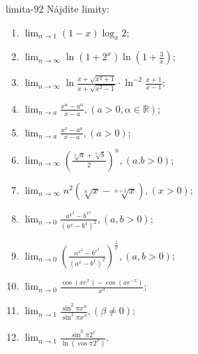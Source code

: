 \begin{defproblem}{limita-92}
Nájdite limity:
\begin{multicols}{2}
\begin{enumerate}
    \item $\lim_{n \rightarrow 1} (1-x)\log_x 2$;
    \item $\lim_{n \rightarrow \infty} \ln (1+2^x) \ln (1+\frac{3}{x})$;
    \item $\lim_{n \rightarrow \infty} \ln \frac{x+\sqrt{x^2+1}}{x+\sqrt{x^2-1}} \cdot \ln ^{-2} \frac{x+1}{x-1}$;
    \item $\lim_{n \rightarrow a} \frac{x^\alpha-a^\alpha}{x-a},(a>0,\alpha \in \mathbb{R})$;
    \item $\lim_{n \rightarrow a} \frac{x^x-a^a}{x-a},(a>0)$;
    \item $\lim_{n \rightarrow \infty} (\frac{\sqrt[n]{a}+\sqrt[n]{b}}{2})^n,(a.b>0)$;
    \item $\lim_{n \rightarrow \infty} n^2(\sqrt[n]{x}-\sqrt[n+1]{x}),(x>0)$;
    \item $\lim_{n \rightarrow 0} \frac{a^{x^2}-b^{x^2}}{(a^x-b^x)^2},(a,b>0)$;
    \item $\lim_{n \rightarrow 0} (\frac{a^{x^2}-b^{x^2}}{(a^x-b^x)^2})^{\frac{1}{x}},(a,b>0)$;
    \item $\lim_{n \rightarrow 0} \frac{\cos (xe^x)-\cos (xe^{-x})}{x^3}$;
    \item $\lim_{n \rightarrow 1} \frac{\sin ^2 \pi x^\alpha}{\sin ^2 \pi x^\beta},(\beta \neq 0)$;
    \item $\lim_{n \rightarrow 1} \frac{\sin ^2 \pi 2^{x}}{\ln (\cos \pi 2^{x})}$.
\end{enumerate}
\end{multicols}
\end{defproblem}

